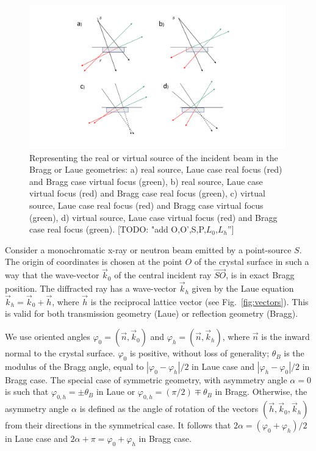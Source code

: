 \documentclass[preprint]{iucr}              %
\newcommand{\todo}[1]{{\color{red}[TODO: "#1'']}}
\newcommand{\inblue}[1]{{\color{blue}#1}}
\begin{document}
\begin{figure}
\label{fig:geometries}
\caption{Representing the real or virtual source of the incident beam in the Bragg or Laue geometries:
a) real source, Laue case real focus (red) and Bragg case virtual focus (green),
b) real source, Laue case virtual focus (red) and Bragg case real focus (green),
c) virtual source, Laue case real focus (red) and Bragg case virtual focus (green),  
d) virtual source, Laue case virtual focus (red) and Bragg case real focus (green). \todo{add O,O',S,P,$L_0$,$L_h$}
}
\includegraphics[width=0.99\textwidth,trim=5cm 2cm 7cm 2cm,clip=true]{fig_geometries.pdf}
\end{figure}

Consider a monochromatic x-ray or neutron beam emitted by a point-source $S$. The origin of coordinates is chosen at the point $O$ of the crystal surface in such a way that the wave-vector  ${\vec k_0}$ of the \inblue{central} incident ray $\vec{SO}$, is in exact Bragg  position. The diffracted ray has a wave-vector $\vec k_h$ given by the Laue equation $\vec k_h = \vec k_0 + \vec h$, where $\vec h$ is the reciprocal lattice vector (see Fig.~\ref{fig:vectors}). This is valid for both transmission geometry (Laue) or reflection geometry (Bragg). 

We use oriented angles $\varphi_0 = (\vec n, \vec k_0)$ and $\varphi_h = (\vec n, \vec k_h)$, where $\vec n$ is the inward normal to the crystal surface. $\varphi_0$ is positive, without loss of generality; $\theta_B$ is the modulus of the Bragg angle, equal to $|\varphi_0-\varphi_h|/2$ in Laue case and  $|\varphi_h-\varphi_0|/2$ in Bragg case. The special case of symmetric geometry, with asymmetry angle $\alpha=0$ is such that $\varphi_{0,h}=\pm\theta_B$ in Laue or $\varphi_{0,h}=(\pi/2)\mp\theta_B$ in Bragg. Otherwise, the asymmetry angle $\alpha$ is defined as the angle of rotation of the vectors $(\vec h, \vec k_0, \vec k_h)$ from their directions in the symmetrical case. 
It follows that $2\alpha=(\varphi_0+\varphi_h)/2$ in Laue case and  $2\alpha+\pi=\varphi_0+\varphi_h$ in Bragg case.
\end{document}

